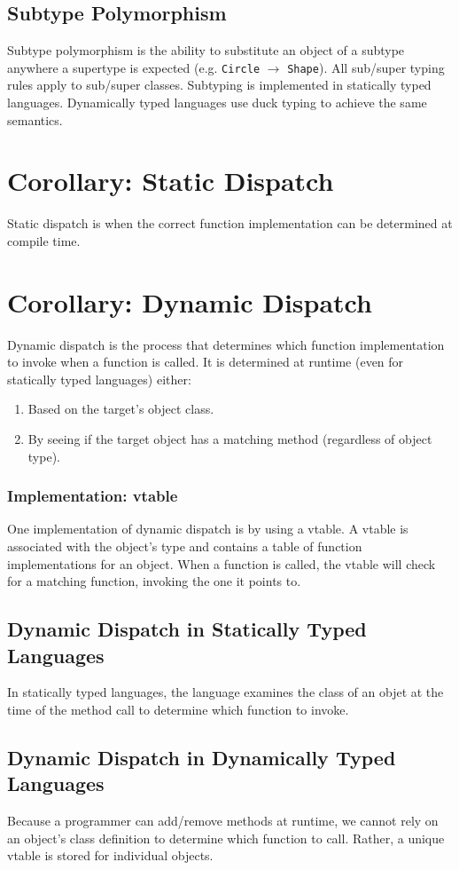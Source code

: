 \documentclass{article}
\begin{document}
\subsection{Subtype Polymorphism}
Subtype polymorphism is the ability to substitute an object of a
subtype anywhere a supertype is expected (e.g. \texttt{Circle} $\to$
\texttt{Shape}). All sub/super typing rules apply to sub/super
classes. Subtyping is implemented in statically typed
languages. Dynamically typed languages use duck typing to achieve the
same semantics.


\section{Corollary: Static Dispatch}
Static dispatch is when the correct function implementation can be
determined at compile time.

\section{Corollary: Dynamic Dispatch}
Dynamic dispatch is the process that determines which function
implementation to invoke when a function is called. It is determined
at runtime (even for statically typed languages) either:
\begin{enumerate}[label=(\roman*)]
\item Based on the target's object class.
\item By seeing if the target object has a matching method (regardless
  of object type).
\end{enumerate}

\subsubsection{Implementation: vtable}
One implementation of dynamic dispatch is by using a vtable. A vtable
is associated with the object's type and contains a table of function
implementations for an object. When a function is called, the vtable
will check for a matching function, invoking the one it points to.

\subsection{Dynamic Dispatch in Statically Typed Languages}
In statically typed languages, the language examines the class of an
objet at the time of the method call to determine which function to
invoke.

\subsection{Dynamic Dispatch in Dynamically Typed Languages}
Because a programmer can add/remove methods at runtime, we cannot rely
on an object's class definition to determine which function to
call. Rather, a unique vtable is stored for individual objects.
\end{document}
